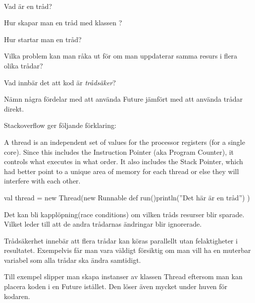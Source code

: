
\QUESTBEGIN

\Task  \what~\Pen

\Subtask Vad är en tråd?

\Subtask Hur skapar man en tråd med klassen ?

\Subtask Hur startar man en tråd?

\Subtask Vilka problem kan man råka ut för om man uppdaterar samma resurs i flera olika trådar?

\Subtask Vad innbär det att kod är \emph{trådsäker}?

\Subtask Nämn några fördelar med att använda Future jämfört med att använda trådar direkt.


\SOLUTION


\TaskSolved \what

\SubtaskSolved  Stackoverflow ger följande förklaring:

A thread is an independent set of values for the processor registers (for a single core). Since this includes the Instruction Pointer (aka Program Counter), it controls what executes in what order. It also includes the Stack Pointer, which had better point to a unique area of memory for each thread or else they will interfere with each other.

\SubtaskSolved

\begin{Code}
val thread = new Thread(new Runnable{
	def run(){println(''Det här är en tråd'')}
})
\end{Code}

\SubtaskSolved  {}

\SubtaskSolved  Det kan bli kapplöpning(race conditions) om vilken tråds resurser blir sparade. Vilket leder till att de andra trådarnas ändringar blir ignorerade.

\SubtaskSolved  Trådsäkerhet innebär att flera trådar kan köras parallellt utan felaktigheter i resultatet. Exempelvis får man vara väldigt försiktig om man vill ha en muterbar variabel som alla trådar ska ändra samtidigt.

\SubtaskSolved  Till exempel slipper man skapa instanser av klassen Thread eftersom man kan placera koden i en Future istället. Den löser även mycket under huven för kodaren.


\QUESTEND







